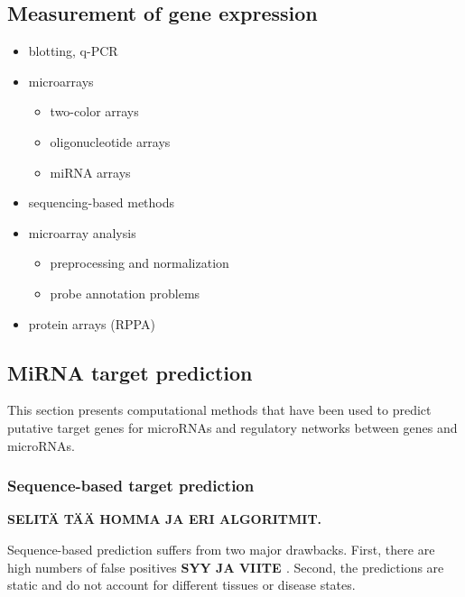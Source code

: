 \subsection{Measurement of gene expression}\label{measurement-of-gene-expression}

\begin{itemize}
  \item blotting, q-PCR
  \item microarrays
  \begin{itemize}
    \item two-color arrays
    \item oligonucleotide arrays
    \item miRNA arrays
  \end{itemize}
  \item sequencing-based methods
  \item microarray analysis
  \begin{itemize}
    \item preprocessing and normalization
    \item probe annotation problems
  \end{itemize}
  \item protein arrays (RPPA)
\end{itemize}









\subsection{MiRNA target prediction}\label{mirna-target-prediction}

This section presents computational methods that have been used to predict
putative target genes for microRNAs and regulatory networks between genes and
microRNAs.





\subsubsection{Sequence-based target prediction}\label{sequence-based-target-
prediction}

\textbf{SELITÄ TÄÄ HOMMA JA ERI ALGORITMIT.}

Sequence-based prediction suffers from two major drawbacks. First, there are
high numbers of false positives \textbf{SYY JA VIITE
\citep{Sethupathy2006?}}. Second, the predictions are static and do not
account for different tissues or disease states.


